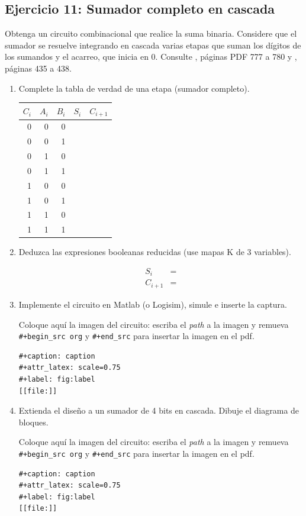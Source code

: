 \documentclass[11pt]{article}
\begin{document}
\subsection{Ejercicio 11: Sumador completo en cascada}
\label{sec:orge299a1e}
Obtenga un circuito combinacional que realice la suma binaria. Considere
que el sumador se resuelve integrando en cascada varias etapas que
suman los dígitos de los sumandos y el acarreo, que inicia en 0.
Consulte \autocite{stallings2006esp}, páginas PDF 777 a 780 y
\autocite{stallings2022computer}, páginas 435 a 438.

\begin{enumerate}
\item Complete la tabla de verdad de una etapa (sumador completo).

\begin{center}
\begin{tabular}{rrrll}
\(C_i\) & \(A_i\) & \(B_i\) & \(S_i\) & \(C_{i+1}\)\\[0pt]
\hline
0 & 0 & 0 &  & \\[0pt]
0 & 0 & 1 &  & \\[0pt]
0 & 1 & 0 &  & \\[0pt]
0 & 1 & 1 &  & \\[0pt]
1 & 0 & 0 &  & \\[0pt]
1 & 0 & 1 &  & \\[0pt]
1 & 1 & 0 &  & \\[0pt]
1 & 1 & 1 &  & \\[0pt]
\end{tabular}
\end{center}

\item Deduzca las expresiones booleanas reducidas (use mapas K de 3 variables).

\begin{align*}
  S_i     &= \\
  C_{i+1} &=
\end{align*}

\item Implemente el circuito en Matlab (o Logisim), simule e inserte la captura.

Coloque aquí la imagen del circuito: escriba el  \emph{path} a la imagen
y remueva \texttt{\#+begin\_src org} y \texttt{\#+end\_src} para insertar la imagen en el pdf. 

\begin{verbatim}
#+caption: caption
#+attr_latex: scale=0.75
#+label: fig:label
[[file:]]
\end{verbatim}

\item Extienda el diseño a un sumador de 4 bits en cascada. Dibuje el
diagrama de bloques.

Coloque aquí la imagen del circuito: escriba el  \emph{path} a la imagen y
remueva \texttt{\#+begin\_src org} y \texttt{\#+end\_src} para insertar la imagen en el pdf. 

\begin{verbatim}
#+caption: caption
#+attr_latex: scale=0.75
#+label: fig:label
[[file:]]
\end{verbatim}
\end{enumerate}
\end{document}
